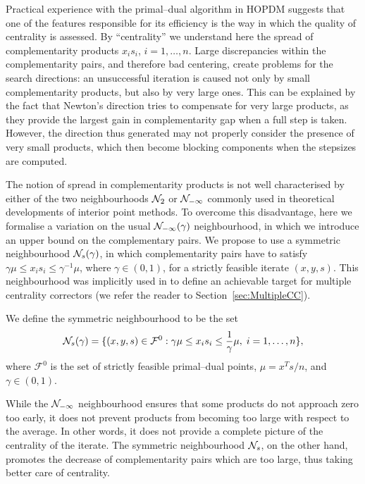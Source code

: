 Practical experience with the primal--dual algorithm in HOPDM \cite{HOPDM}
suggests that one of the features responsible 
for its efficiency is the way in which the quality of centrality 
is assessed. By ``centrality'' we understand here the spread 
of complementarity products $x_i s_i$, $i = 1,\dots,n$.
Large discrepancies within the complementarity 
pairs, and therefore bad centering, create problems for the search 
directions: an unsuccessful iteration is caused not only by small
complementarity products, but also by very large ones.
%
 This can be explained by the fact that
Newton's direction tries to compensate for very 
large products, as they provide the largest gain in complementarity 
gap when a full step is taken. However, the direction thus generated 
may not properly consider the presence of very small products, 
which then become blocking components when the stepsizes are computed.

The notion of spread in complementarity products
is not well characterised by either 
of the two neighbourhoods $\mathcal{N}_2$ or $\mathcal{N}_{-\infty}$ commonly used 
in theoretical developments of interior point methods.
To overcome this disadvantage, here we formalise a variation 
on the usual $\mathcal{N}_{-\infty}(\gamma)$ neighbourhood, 
in which we introduce an upper bound on the complementary pairs. 
We propose to use a symmetric neighbourhood $\mathcal{N}_s(\gamma)$,
in which complementarity pairs have to satisfy 
$\gamma \mu \leq x_i s_i \leq \gamma^{-1} \mu$, where $\gamma \in (0,1)$, 
for a strictly feasible iterate $(x,y,s)$.
This neighbourhood was implicitly used in \cite{Gondzio96}
to define an achievable target for multiple centrality correctors
(we refer the reader to Section~\ref{sec:MultipleCC}).

We define the symmetric neighbourhood to be the set
\[
  \mathcal{N}_s(\gamma)=\{(x,y,s)\in \mathcal{F}^0: 
  \gamma\mu\le x_is_i \le \frac{1}{\gamma}\mu, \; i=1,\ldots,n\},
\]
where $\mathcal{F}^0$ 
is the set of strictly feasible primal--dual points,
$\mu = x^Ts/n$, and $\gamma \in (0,1)$.

While the $\mathcal{N}_{-\infty}$ neighbourhood ensures that some 
products do not approach zero too early, it does not prevent products
from becoming too large with respect to the average.
In other words, it does not provide a complete 
picture of the centrality of the iterate. The symmetric 
neighbourhood $\mathcal{N}_s$, on the other hand, promotes 
the decrease of complementarity pairs which are too large, thus taking 
better care of centrality.


